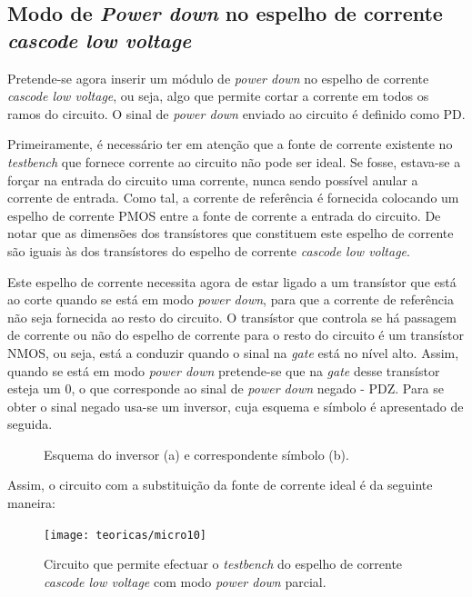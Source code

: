 \documentclass[11pt]{article}
\numberwithin{equation}{section}
\begin{document}
\subsection{Modo de \textit{Power down} no espelho de corrente \textit{cascode low voltage}}

Pretende-se agora inserir um módulo de \textit{power down} no espelho de corrente \textit{cascode low voltage}, ou seja, algo que permite cortar a corrente em todos os ramos do circuito. O sinal de \textit{power down} enviado ao circuito é definido como PD. 

Primeiramente, é necessário ter em atenção que a fonte de corrente existente no \textit{testbench} que fornece corrente ao circuito não pode ser ideal. Se fosse, estava-se a forçar na entrada do circuito uma corrente, nunca sendo possível anular a corrente de entrada. Como tal, a corrente de referência é fornecida colocando um espelho de corrente PMOS entre a fonte de corrente a entrada do circuito. De notar que as dimensões dos transístores que constituem este espelho de corrente são iguais às dos transístores do espelho de corrente \textit{cascode low voltage}.

Este espelho de corrente necessita agora de estar ligado a um transístor que está ao corte quando se está em modo \textit{power down}, para que a corrente de referência não seja fornecida ao resto do circuito. O transístor que controla se há passagem de corrente ou não do espelho de corrente para o resto do circuito é um transístor NMOS, ou seja, está a conduzir quando o sinal na \textit{gate} está no nível alto. Assim, quando se está em modo \textit{power down} pretende-se que na \textit{gate} desse transístor esteja um 0, o que corresponde ao sinal de \textit{power down} negado - PDZ. Para se obter o sinal negado usa-se um inversor, cuja esquema e símbolo é apresentado de seguida.

\begin{figure}[H]
	\centering
	\hspace{2mm}
	\vspace{-0.8em}
	\caption{Esquema do inversor (a) e correspondente símbolo (b).}
	\vspace{-0.8em}
\end{figure}

Assim, o circuito com a substituição da fonte de corrente ideal é da seguinte maneira:

\begin{figure}[H]
	\centering
	\texttt{[image: teoricas/micro10]}
	\vspace{-0.8em}
	\caption{Circuito que permite efectuar o \textit{testbench} do espelho de corrente \textit{cascode low voltage} com modo \textit{power down} parcial.}
	\vspace{-0.8em}
\end{figure}
\end{document}
